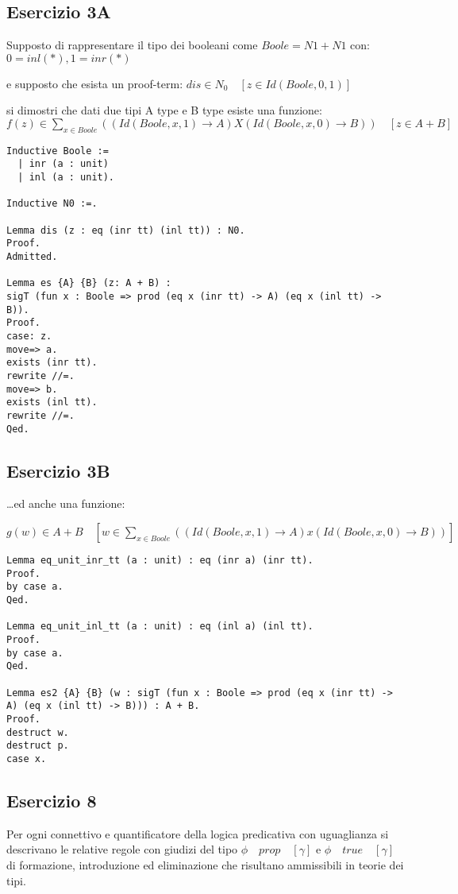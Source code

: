 \subsection{Esercizio 3A}

Supposto di rappresentare il tipo dei booleani come $Boole = N1 + N1$ con:
$0 = inl(*), 1 = inr(*)$

e supposto che esista un proof-term:
$dis \in N_0 \quad [z \in Id(Boole, 0, 1)]$

si dimostri che dati due tipi A type e B type esiste una funzione:
$f(z) \in \sum_{x \in Boole} ( (Id(Boole, x, 1) \rightarrow A) X (Id(Boole, x, 0) \rightarrow B) ) \quad [ z \in A + B ]$

\begin{lstlisting}[language=Coq]
Inductive Boole :=
  | inr (a : unit)
  | inl (a : unit).

Inductive N0 :=.

Lemma dis (z : eq (inr tt) (inl tt)) : N0.
Proof.
Admitted.

Lemma es {A} {B} (z: A + B) :
sigT (fun x : Boole => prod (eq x (inr tt) -> A) (eq x (inl tt) -> B)).
Proof.
case: z.
move=> a.
exists (inr tt).
rewrite //=.
move=> b.
exists (inl tt).
rewrite //=.
Qed.
\end{lstlisting}

\subsection{Esercizio 3B}

\dots ed anche una funzione:

$g(w) \in A + B \quad [w \in \sum_{x \in Boole} ( (Id(Boole, x, 1) \rightarrow A) x (Id(Boole, x, 0) \rightarrow B) )]$

\begin{lstlisting}[language=Coq]
Lemma eq_unit_inr_tt (a : unit) : eq (inr a) (inr tt).
Proof.
by case a.
Qed.

Lemma eq_unit_inl_tt (a : unit) : eq (inl a) (inl tt).
Proof.
by case a.
Qed.

Lemma es2 {A} {B} (w : sigT (fun x : Boole => prod (eq x (inr tt) -> A) (eq x (inl tt) -> B))) : A + B.
Proof.
destruct w.
destruct p.
case x.
\end{lstlisting}

\subsection{Esercizio 8}

Per ogni connettivo e quantificatore della logica predicativa con uguaglianza si
descrivano le relative regole con giudizi del tipo $\phi \quad prop \quad [\gamma]$ e
$\phi \quad true \quad [\gamma]$ di formazione, introduzione ed eliminazione che risultano
ammissibili in teorie dei tipi.

